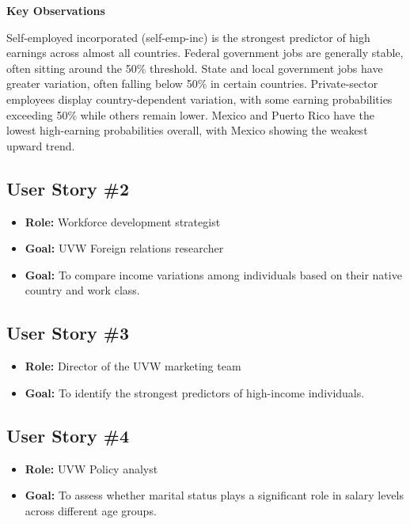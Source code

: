 \documentclass[journal,onecolumn]{IEEEtran}
\begin{document}
\medskip

\textbf{Key Observations}

Self-employed incorporated (self-emp-inc) is the strongest predictor of high earnings across almost all countries.
Federal government jobs are generally stable, often sitting around the 50\% threshold.
State and local government jobs have greater variation, often falling below 50\% in certain countries.
Private-sector employees display country-dependent variation, with some earning probabilities exceeding 50\% while others remain lower.
Mexico and Puerto Rico have the lowest high-earning probabilities overall, with Mexico showing the weakest upward trend.

\medskip

\subsection{User Story \#2}
\begin{itemize}
    \item \textbf{Role:} Workforce development strategist
    \item \textbf{Goal:} UVW Foreign relations researcher
    \item \textbf{Goal:} To compare income variations among individuals based on their native country and work class.
\end{itemize}

\subsection{User Story \#3}
\begin{itemize}
    \item \textbf{Role:} Director of the UVW marketing team
    \item \textbf{Goal:} To identify the strongest predictors of high-income individuals.
\end{itemize}

\subsection{User Story \#4}
\begin{itemize}
    \item \textbf{Role:} UVW Policy analyst
    \item \textbf{Goal:} To assess whether marital status plays a significant role in salary levels across different age groups.
\end{itemize}
\end{document}
